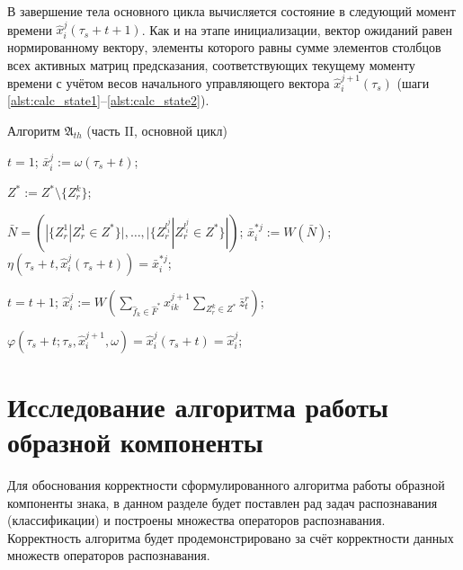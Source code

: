 В завершение тела основного цикла вычисляется состояние в следующий момент времени $\hat x_i^j(\tau_s+t+1)$. Как и на этапе инициализации, вектор ожиданий равен нормированному вектору, элементы которого равны сумме элементов столбцов всех активных матриц предсказания, соответствующих текущему моменту времени с учётом весов начального управляющего вектора $\hat x_i^{j+1}(\tau_s)$ (шаги \ref{alst:calc_state1}--\ref{alst:calc_state2}).
\begin{algorithm}[H]
	\caption{Алгоритм $\mathfrak{A}_{th}$ (часть II, основной цикл)}\label{alg:th_cycle}
	\begin{algorithmic}[1]
		\State $t=1$;
		 \label{alst:cycle_start}
			\State $\bar{x}_i^j:=\omega(\tau_s+t)$;

				 \label{alst:update_z}
					\State $Z^*:=Z^*\setminus\{Z_r^k\}$;
				\EndIf
			\EndFor

			\State $\bar N=(|\{Z_r^1|Z_r^1\in Z^*\}|,\dots,|\{Z_r^{l_i^j}|Z_r^{l_i^j}\in Z^*\}|)$; \label{alst:calc_out1}
			\State $\bar{x}_i^{*j}:=W(\bar N)$; \label{alst:calc_out2}
			\State $\eta(\tau_s+t, \hat{x}_i^j(\tau_s+t))=\bar{x}_i^{*j}$; \label{alst:calc_out3}
						
			\State $t=t+1$;
				\State $\hat{x}_i^j:=W(\sum_{\hat f_k\in\hat F^*}\hat x_{ik}^{j+1}\sum_{Z_r^k\in Z^*}\bar z_t^r)$; \label{alst:calc_state1}
							
				\State $\varphi(\tau_s+t;\tau_s,\hat{x}_i^{j+1}, \omega)=\hat{x}_i^j(\tau_s+t)=\hat{x}_i^j$; \label{alst:calc_state2}
			\EndIf
		\EndWhile \label{alst:cycle_end}
	\end{algorithmic}
\end{algorithm}

\section{Исследование алгоритма работы образной компоненты}\label{sect3_2}

Для обоснования корректности сформулированного алгоритма работы образной компоненты знака, в данном разделе будет поставлен рад задач распознавания (классификации) и построены множества операторов распознавания. Корректность алгоритма будет продемонстрировано за счёт корректности данных множеств операторов распознавания.

